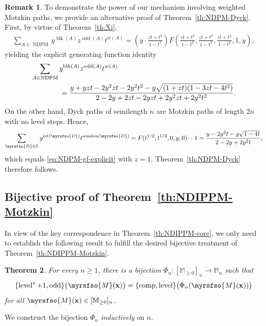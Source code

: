 \documentclass[12pt,reqno]{amsart}
\numberwithin{equation}{section}
\theoremstyle{theorem}
\newtheorem{theorem}{Theorem}[section]
\theoremstyle{definition}
\newtheorem{remark}[theorem]{Remark}
\theoremstyle{named}
\newcommand{\NDPM}{\operatorname{NDPM}}
\newcommand{\odd}{\operatorname{odd}}
\newcommand{\blk}{\operatorname{blk}}
\newcommand{\semilen}{\operatorname{semilen}}
\newcommand{\comp}{\operatorname{comp}}
\newcommand{\level}{\operatorname{level}}
\newcommand{\x}{\operatorname{x}}
\newcommand{\touch}{\operatorname{ret}}
\newcommand{\cM}{\myrsfso{M}}
\newcommand{\bbM}{\mathbb{M}}
\newcommand{\cD}{\myrsfso{D}}
\newcommand{\bbD}{\mathbb{D}}
\newcommand{\bfx}{\mathbf{x}}
\begin{document}
\begin{remark}
	To demonstrate the power of our mechanism involving weighted Motzkin paths, we provide an alternative proof of Theorem~\ref{th:NDPM-Dyck}. First, by virtue of Theorem~\ref{th:Xi},
	\begin{align*}
		\sum_{A \in \NDPM} y^{\blk(A)} z^{\odd(A)} t^{w(A)} = \left(y\cdot \frac{zt+t^2}{1-t^2}\right) F\left(\frac{zt+t^2}{1-t^2}, \frac{zt+t^2}{1-t^2}, \frac{zt+t^2}{1-t^2}, 1, y\right),
	\end{align*}
	yielding the explicit generating function identity
	\begin{align}\label{eq:NDPM-gf-explicit}
		&\sum_{A \in \NDPM} y^{\blk(A)} z^{\odd(A)} t^{w(A)}\notag\\
		&\qquad\qquad = \frac{y + y z t - 2 y^2 z t - 2 y^2 t^2 - y \sqrt{(1 + z t)(1 - 3 z t - 4 t^2)}}{2 - 2 y + 2 z t - 2 y z t + 2 y^2 z t + 2 y^2 t^2}.
	\end{align}
	On the other hand, Dyck paths of semilength $n$ are Motzkin paths of length $2n$ with no level steps. Hence,
	\begin{align*}
		\sum_{\cD\in \bbD} y^{\touch(\cD)} t^{\semilen(\cD)} = F(t^{1/2},t^{1/2},0,y,0) - 1 = \frac{y - 2 y^2 t - y\sqrt{1-4t}}{2 - 2 y + 2 y^2 t},
	\end{align*}
	which equals \eqref{eq:NDPM-gf-explicit} with $z = 1$. Theorem~\ref{th:NDPM-Dyck} therefore follows.
\end{remark}

\subsection{Bijective proof of Theorem~\ref{th:NDIPPM-Motzkin}}\label{sec:NDIPPM-comb}

In view of the key correspondence in Theorem~\ref{th:NDIPPM-core}, we only need to establish the following result to fulfill the desired bijective treatment of Theorem~\ref{th:NDIPPM-Motzkin}.

\begin{theorem}\label{th:NDIPPM-comb}
	For every $n\ge 1$, there is a bijection $\Phi_n : [\bbM_{\ge 0}]_n \to \bbM_n$ such that
	\begin{align}
		\{\level^{\x}+1,\odd\}\big(\cM(\bfx)\big) = \{\comp,\level\} \big(\Phi_n(\cM(\bfx))\big)
	\end{align}
	for all $\cM(\bfx)\in [\bbM_{\ge 0}]_n$.
\end{theorem}

We construct the bijection $\Phi_n$ \emph{inductively} on $n$.
\end{document}
